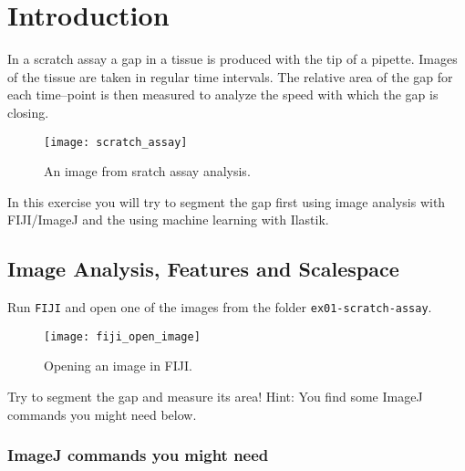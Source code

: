 \chapter{Introduction}

In a scratch assay a gap in a tissue is produced with the tip of a pipette. Images of the tissue are taken in regular time intervals. The relative area of the gap for each time--point is then measured to analyze the speed with which the gap is closing.  

\begin{figure}[!htb]
 \centering
 \texttt{[image: scratch\_assay]}
 \caption{An image from sratch assay analysis.}
 \label{figure:scratch-assay}
\end{figure}

In this exercise you will try to segment the gap first using image analysis with FIJI/ImageJ and the using machine learning with Ilastik.

\section{Image Analysis, Features and Scalespace}

Run {\tt FIJI} and open one of the images from the folder {\tt ex01-scratch-assay}.

\begin{figure}[!htb]
 \centering
 \texttt{[image: fiji\_open\_image]}
 \caption{Opening an image in FIJI.}
 \label{figure:fiji-open-image}
\end{figure}

Try to segment the gap and measure its area! Hint: You find some ImageJ commands you might need below.

\subsection{ImageJ commands you might need}

